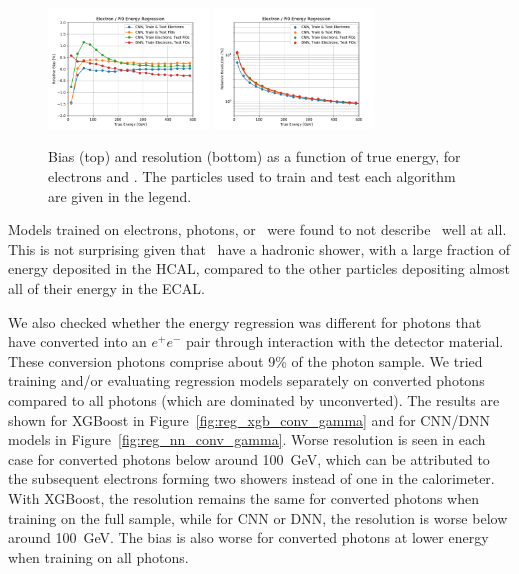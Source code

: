 \begin{figure}[htbp]
\centering
\includegraphics[width=0.38\textwidth]{Images/Calo/bias_vs_E_ElePi0Fixed_nn_cross_zoom.pdf}
\includegraphics[width=0.38\textwidth]{Images/Calo/res_vs_E_ElePi0Fixed_nn_cross_fits.pdf}
\caption{Bias (top) and resolution (bottom) as a function of true energy, for electrons and \pizero.  The particles used to train and test each algorithm are given in the legend.
}
\label{fig:reg_nn_cross_pi0}
\end{figure}

Models trained on electrons, photons, or \pizero\ were found to not describe \chpi\ well at all.  This is not surprising given that \chpi\ have a hadronic shower, with a large fraction of energy deposited in the HCAL, compared to the other particles depositing almost all of their energy in the ECAL.

We also checked whether the energy regression was different for photons that have converted into an $e^{+}e^{-}$ pair through interaction with the detector material.  These conversion photons comprise about 9\% of the photon sample.  We tried training and/or evaluating regression models separately on converted photons compared to all photons (which are dominated by unconverted).  The results are shown for XGBoost in Figure~\ref{fig:reg_xgb_conv_gamma} and for CNN/DNN models in Figure~\ref{fig:reg_nn_conv_gamma}.  Worse resolution is seen in each case for converted photons below around 100~GeV, which can be attributed to the subsequent electrons forming two showers instead of one in the calorimeter.  With XGBoost, the resolution remains the same for converted photons when training on the full sample, while for CNN or DNN, the resolution is worse below around 100~GeV.  The bias is also worse for converted photons at lower energy when training on all photons.

